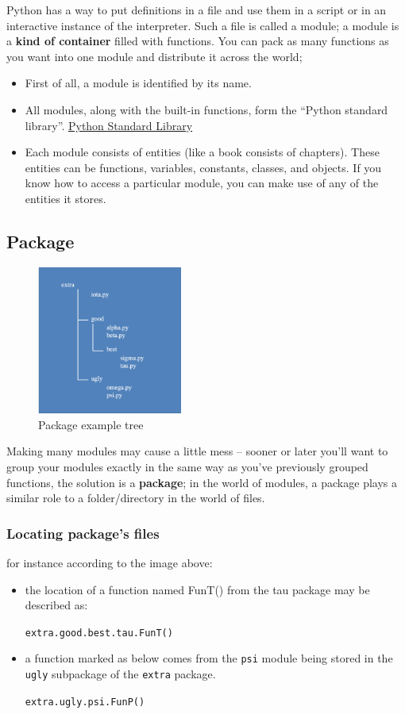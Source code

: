 \documentclass[11pt]{article}
\begin{document}
Python has a way to put definitions in a file and use them in a script
or in an interactive instance of the interpreter. Such a file is
called a module; a module is a \textbf{kind of container} filled with
functions. You can pack as many functions as you want into one module
and distribute it across the world;

\begin{itemize}
\item First of all, a module is identified by its name.
\item All modules, along with the built-in functions, form the
“Python standard library”. \href{https://docs.python.org/3/library/index.html}{Python Standard Library}
\item Each module consists of entities (like a book consists of
chapters). These entities can be functions, variables, constants,
classes, and objects. If you know how to access a particular module,
you can make use of any of the entities it stores.
\end{itemize}

\newpage
\subsection{Package}
\label{sec:orgb045de3}

\begin{figure}[htbp]
\centering
\includegraphics[width=180px]{./images/packageTree.png}
\caption{Package example tree}
\end{figure}

Making many modules may cause a little mess – sooner or
later you’ll want to group your modules exactly in the
same way as you’ve previously grouped functions, the
solution is a \textbf{package}; in the world of modules, a
package plays a similar role to a folder/directory in the
world of files.

\subsubsection{Locating package's files}
\label{sec:orgcc42ee6}
for instance according to the image above:
\begin{itemize}
\item the location of a function named FunT() from the tau package may be
described as:

\texttt{extra.good.best.tau.FunT()}

\item a function marked as below comes from the \texttt{psi} module being stored in
the \texttt{ugly} subpackage of the \texttt{extra} package.

\texttt{extra.ugly.psi.FunP()}
\end{itemize}
\end{document}
